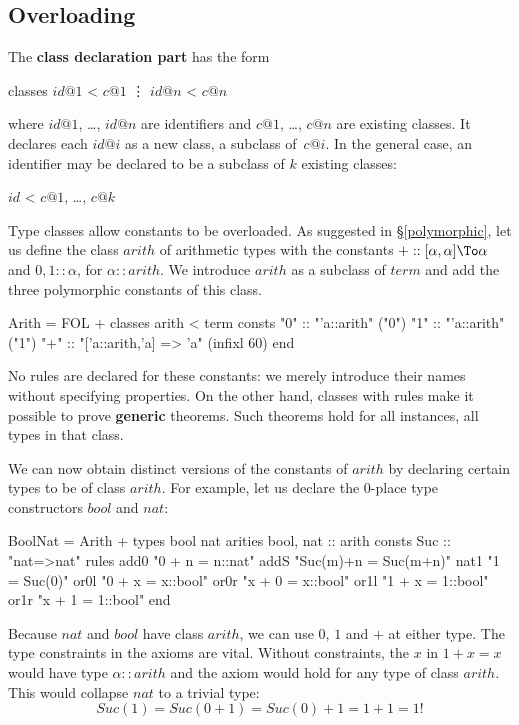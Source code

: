 \subsection{Overloading}
The {\bf class declaration part} has the form
\begin{ttbox}
classes \(id@1\) < \(c@1\)
        \vdots
        \(id@n\) < \(c@n\)
\end{ttbox}
where $id@1$, \ldots, $id@n$ are identifiers and $c@1$, \ldots, $c@n$ are
existing classes.  It declares each $id@i$ as a new class, a subclass
of~$c@i$.  In the general case, an identifier may be declared to be a
subclass of $k$ existing classes:
\begin{ttbox}
        \(id\) < \(c@1\), \ldots, \(c@k\)
\end{ttbox}
Type classes allow constants to be overloaded.  As suggested in
\S\ref{polymorphic}, let us define the class $arith$ of arithmetic
types with the constants ${+} :: [\alpha,\alpha]\To \alpha$ and $0,1 {::}
\alpha$, for $\alpha{::}arith$.  We introduce $arith$ as a subclass of
$term$ and add the three polymorphic constants of this class.
\begin{ttbox}
Arith = FOL +
classes arith < term
consts  "0"     :: "'a::arith"                  ("0")
        "1"     :: "'a::arith"                  ("1")
        "+"     :: "['a::arith,'a] => 'a"       (infixl 60)
end
\end{ttbox}
No rules are declared for these constants: we merely introduce their
names without specifying properties.  On the other hand, classes
with rules make it possible to prove {\bf generic} theorems.  Such
theorems hold for all instances, all types in that class.

We can now obtain distinct versions of the constants of $arith$ by
declaring certain types to be of class $arith$.  For example, let us
declare the 0-place type constructors $bool$ and $nat$:
\begin{ttbox}
BoolNat = Arith +
types   bool  nat
arities bool, nat   :: arith
consts  Suc         :: "nat=>nat"
\ttbreak
rules   add0        "0 + n = n::nat"
        addS        "Suc(m)+n = Suc(m+n)"
        nat1        "1 = Suc(0)"
        or0l        "0 + x = x::bool"
        or0r        "x + 0 = x::bool"
        or1l        "1 + x = 1::bool"
        or1r        "x + 1 = 1::bool"
end
\end{ttbox}
Because $nat$ and $bool$ have class $arith$, we can use $0$, $1$ and $+$ at
either type.  The type constraints in the axioms are vital.  Without
constraints, the $x$ in $1+x = x$ would have type $\alpha{::}arith$
and the axiom would hold for any type of class $arith$.  This would
collapse $nat$ to a trivial type:
\[ Suc(1) = Suc(0+1) = Suc(0)+1 = 1+1 = 1! \]


